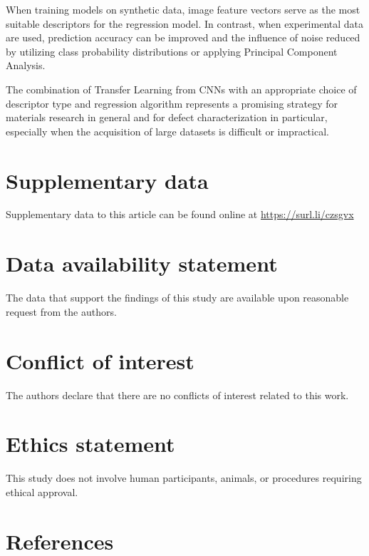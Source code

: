 \documentclass[10pt]{iopart}
\begin{document}
When training models on synthetic data, image feature vectors serve as the most suitable descriptors for the regression model.
In contrast, when experimental data are used, prediction accuracy can be improved and the influence of noise reduced
by utilizing class probability distributions or applying Principal Component Analysis.

The combination of Transfer Learning from CNNs with an appropriate choice of descriptor type
and regression algorithm represents a promising strategy for materials research in general
and for defect characterization in particular,
especially when the acquisition of large datasets is difficult or impractical.

\section*{Supplementary data}\label{SuplData}
Supplementary data to this article can be found online at
\url{https://surl.li/czsgvx}

\section*{Data availability statement}
The data that support the findings of this study are available upon reasonable request from the authors.

\section*{Conflict of interest}
The authors declare that there are no conflicts of interest related to this work.

\section*{Ethics statement}
This study does not involve human participants, animals, or
 procedures requiring ethical approval.


\section*{References}



\end{document}
